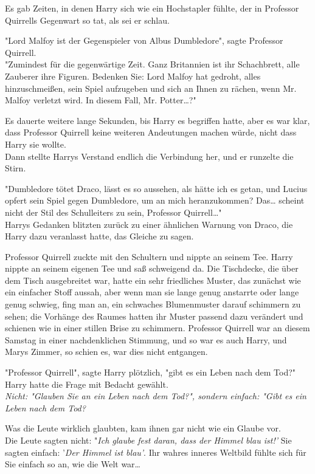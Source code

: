 {Es gab Zeiten, in denen Harry sich wie ein Hochstapler fühlte, der in Professor Quirrells Gegenwart so tat, als sei er schlau.

"Lord Malfoy ist der Gegenspieler von Albus Dumbledore", sagte Professor Quirrell.\\ "Zumindest für die gegenwärtige Zeit. Ganz Britannien ist ihr Schachbrett, alle Zauberer ihre Figuren. Bedenken Sie: Lord Malfoy hat gedroht, alles hinzuschmeißen, sein Spiel aufzugeben und sich an Ihnen zu rächen, wenn Mr. Malfoy verletzt wird. In diesem Fall, Mr. Potter…?"

Es dauerte weitere lange Sekunden, bis Harry es begriffen hatte, aber es war klar, dass Professor Quirrell keine weiteren Andeutungen machen würde, nicht dass Harry sie wollte.\\ Dann stellte Harrys Verstand endlich die Verbindung her, und er runzelte die Stirn.

"Dumbledore tötet Draco, lässt es so aussehen, als hätte ich es getan, und Lucius opfert sein Spiel gegen Dumbledore, um an mich heranzukommen? Das… scheint nicht der Stil des Schulleiters zu sein, Professor Quirrell…"\\ Harrys Gedanken blitzten zurück zu einer ähnlichen Warnung von Draco, die Harry dazu veranlasst hatte, das Gleiche zu sagen.

Professor Quirrell zuckte mit den Schultern und nippte an seinem Tee. Harry nippte an seinem eigenen Tee und saß schweigend da. Die Tischdecke, die über dem Tisch ausgebreitet war, hatte ein sehr friedliches Muster, das zunächst wie ein einfacher Stoff aussah, aber wenn man sie lange genug anstarrte oder lange genug schwieg, fing man an, ein schwaches Blumenmuster darauf schimmern zu sehen; die Vorhänge des Raumes hatten ihr Muster passend dazu verändert und schienen wie in einer stillen Brise zu schimmern. Professor Quirrell war an diesem Samstag in einer nachdenklichen Stimmung, und so war es auch Harry, und Marys Zimmer, so schien es, war dies nicht entgangen.

"Professor Quirrell", sagte Harry plötzlich, "gibt es ein Leben nach dem Tod?"\\ Harry hatte die Frage mit Bedacht gewählt.\\ \emph{Nicht: "Glauben Sie an ein Leben nach dem Tod?", sondern einfach: "Gibt es ein Leben nach dem Tod?}

Was die Leute wirklich glaubten, kam ihnen gar nicht wie ein Glaube vor.\\ Die Leute sagten nicht: "\emph{Ich glaube fest daran, dass der Himmel blau ist!'} Sie sagten einfach: '\emph{Der Himmel ist blau'}. Ihr wahres inneres Weltbild fühlte sich für Sie einfach so an, wie die Welt war…

}
